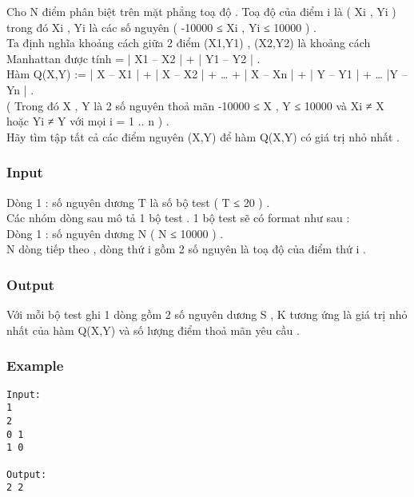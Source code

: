 



   Cho N điểm phân biệt trên mặt phẳng toạ độ . Toạ độ của điểm i là ( Xi , Yi ) trong đó Xi , Yi là các số nguyên ( -10000 ≤ Xi , Yi ≤ 10000 ) .   
\\   Ta định nghĩa khoảng cách giữa 2 điểm (X1,Y1) , (X2,Y2) là khoảng cách Manhattan được tính = | X1 – X2 | + | Y1 – Y2 | .   
\\   Hàm Q(X,Y) := | X – X1 | + | X – X2 | + … + | X – Xn | + | Y – Y1 | + … |Y – Yn | .   
\\   ( Trong đó X , Y là 2 số nguyên thoả mãn -10000 ≤ X , Y ≤ 10000 và Xi ≠ X hoặc Yi ≠ Y với mọi i = 1 .. n  ) .   
\\   Hãy tìm tập tất cả các điểm nguyên (X,Y) để hàm Q(X,Y) có giá trị nhỏ nhất .  

\subsubsection{   Input  }

   Dòng 1 : số nguyên dương T là số bộ test ( T ≤ 20 ) .   
\\   Các nhóm dòng sau mô tả 1 bộ test . 1 bộ test sẽ có format như sau :   
\\   Dòng 1 : số nguyên dương N (  N ≤ 10000 ) .   
\\   N dòng tiếp theo , dòng thứ i gồm 2 số nguyên là toạ độ của điểm thứ i .  

\subsubsection{   Output  }

   Với mỗi bộ test ghi 1 dòng gồm 2 số nguyên dương S , K tương ứng là giá trị nhỏ nhất của hàm Q(X,Y) và số lượng điểm thoả mãn yêu cầu .   
\\

\subsubsection{   Example  }
\begin{verbatim}
Input:
1
2
0 1
1 0

Output:
2 2
\end{verbatim}
